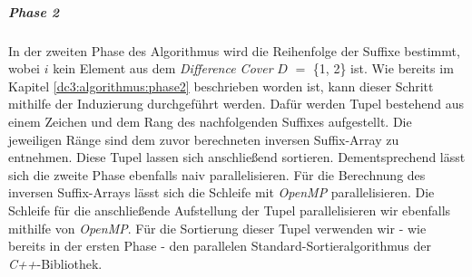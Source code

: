 \subparagraph*{Phase 2}
In der zweiten Phase des Algorithmus wird die Reihenfolge der Suffixe  bestimmt, wobei $i$ kein Element aus dem \emph{Difference Cover} \(D\) $=$ \{1, 2\} ist. Wie bereits im Kapitel \ref{dc3:algorithmus:phase2} beschrieben worden ist, kann dieser Schritt mithilfe der Induzierung durchgeführt werden. Dafür werden Tupel bestehend aus einem Zeichen  und dem Rang des nachfolgenden Suffixes  aufgestellt. Die jeweiligen Ränge sind dem zuvor berechneten inversen Suffix-Array zu entnehmen. Diese Tupel lassen sich anschließend sortieren.
Dementsprechend lässt sich die zweite Phase ebenfalls naiv parallelisieren. Für die Berechnung des inversen Suffix-Arrays lässt sich die Schleife mit \emph{OpenMP} parallelisieren. Die Schleife für die anschließende Aufstellung der Tupel parallelisieren wir ebenfalls mithilfe von \emph{OpenMP}. Für die Sortierung dieser Tupel verwenden wir - wie bereits in der ersten Phase - den parallelen Standard-Sortieralgorithmus der \emph{C++}-Bibliothek.